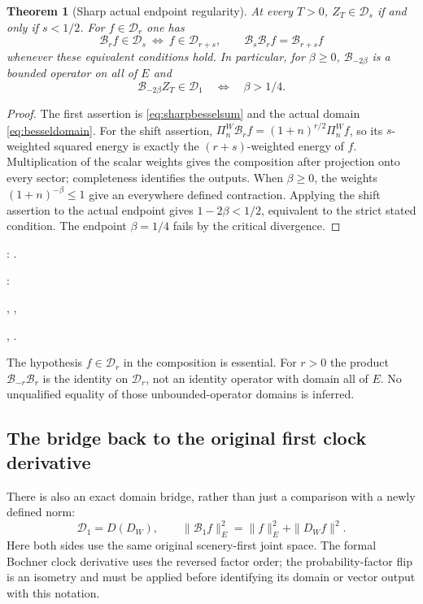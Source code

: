 \documentclass[11pt]{article}
\newtheorem{theorem}{Theorem}[section]
\begin{document}
\begin{theorem}[Sharp actual endpoint regularity]\label{thm:bessel}
At every $T>0$, $Z_T\in\mathcal D_s$ if and only if $s<1/2$.
For $f\in\mathcal D_r$ one has
\[
 \mathcal B_rf\in\mathcal D_s\ \Longleftrightarrow\ f\in\mathcal D_{r+s},
 \qquad \mathcal B_s\mathcal B_rf=\mathcal B_{r+s}f
\]
whenever these equivalent conditions hold. In particular, for $\beta\geq0$,
$\mathcal B_{-2\beta}$ is a bounded operator on all of $E$ and
\[
 \mathcal B_{-2\beta}Z_T\in\mathcal D_1
                         \quad\Longleftrightarrow\quad\beta>1/4.
\]
\end{theorem}
\begin{proof}
The first assertion is \eqref{eq:sharpbesselsum} and the actual domain
\eqref{eq:besseldomain}. For the shift assertion,
$\Pi_n^W\mathcal B_rf=(1+n)^{r/2}\Pi_n^Wf$, so its $s$-weighted
squared energy is exactly the $(r+s)$-weighted energy of $f$.
Multiplication of the scalar weights gives the composition after
projection onto every sector; completeness identifies the outputs.
When $\beta\geq0$, the weights $(1+n)^{-\beta}\leq1$ give an everywhere
defined contraction. Applying the shift assertion to the actual endpoint
gives $1-2\beta<1/2$, equivalent to the strict stated condition.
The endpoint $\beta=1/4$ fails by the critical divergence.
\end{proof}
\par\noindent{}: .
\par\noindent{}:
\par\noindent{}, ,
\par\noindent{}, .

The hypothesis $f\in\mathcal D_r$ in the composition is essential.
For $r>0$ the product $\mathcal B_{-r}\mathcal B_r$ is the identity on
$\mathcal D_r$, not an identity operator with domain all of $E$.
No unqualified equality of those unbounded-operator domains is inferred.

\subsection*{The bridge back to the original first clock derivative}
There is also an exact domain bridge, rather than just a comparison with
a newly defined norm:
\begin{equation}\label{eq:nativebessel}
 \mathcal D_1=D(D_W),\qquad
 \|\mathcal B_1f\|_E^2=\|f\|_E^2+\|D_Wf\|^2.
\end{equation}
Here both sides use the same original scenery-first joint space. The
formal Bochner clock derivative uses the reversed factor order; the
probability-factor flip is an isometry and must be applied before
identifying its domain or vector output with this notation.
\end{document}
